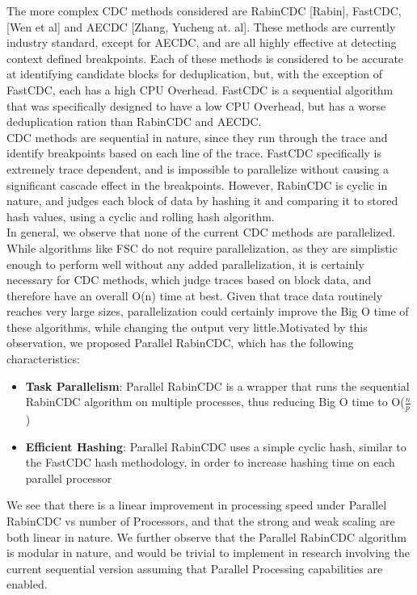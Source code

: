 \documentclass{acmtog} %
\begin{document}
		The more complex CDC methods considered are RabinCDC [Rabin], FastCDC, [Wen et al] and AECDC [Zhang, Yucheng at. al]. These methods are currently industry standard, except for AECDC, and are all highly effective at detecting context defined breakpoints. Each of these methods is considered to be accurate at identifying candidate blocks for deduplication, but, with the exception of FastCDC, each has a high CPU Overhead. FastCDC is a sequential algorithm that was specifically designed to have a low CPU Overhead, but has a worse deduplication ration than RabinCDC and AECDC.\\
		
		CDC methods are sequential in nature, since they run through the trace and identify breakpoints based on each line of the trace. FastCDC specifically is extremely trace dependent, and is impossible to parallelize without causing a significant cascade effect in the breakpoints. However, RabinCDC is cyclic in nature, and judges each block of data by hashing it and comparing it to stored hash values, using a cyclic and rolling hash algorithm. \\
		
		In general, we observe that none of the current CDC methods are parallelized. While algorithms like FSC do not require parallelization, as they are simplistic enough to perform well without any added parallelization, it is certainly necessary for CDC methods, which judge traces based on block data, and therefore have an overall O(n) time at best. Given that trace data routinely reaches very large sizes, parallelization could certainly improve the Big O time of these algorithms, while changing the output very little.Motivated by this observation, we proposed Parallel RabinCDC, which has the following characteristics:
		
		\begin{itemize}
		\item \textbf{Task Parallelism}: Parallel RabinCDC is a wrapper that runs the sequential RabinCDC algorithm on multiple processes, thus reducing Big O time to O($\frac{n}{p}$)
		\item \textbf{Efficient Hashing}: Parallel RabinCDC uses a simple cyclic hash, similar to the FastCDC hash methodology, in order to increase hashing time on each parallel processor 
		\end{itemize}
		
		We see that there is a linear improvement in processing speed under Parallel RabinCDC vs number of Processors, and that the strong and weak scaling are both linear in nature. We further observe that the Parallel RabinCDC algorithm is modular in nature, and would be trivial to implement in research involving the current sequential version assuming that Parallel Processing capabilities are enabled.\\
		
\end{document}
